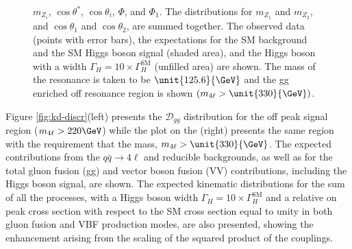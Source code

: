 \begin{figure}
{$m_{Z_i}$, $\cos\theta^*$, $\cos\theta_{i}$, $\Phi$, and $\Phi_{1}$. The distributions for $m_{Z_{1}}$ and $m_{Z_{2}}$, and $\cos\theta_{1}$ and $\cos\theta_{2}$, are summed together. The observed data (points with error bars), the expectations for the SM background and the SM Higgs boson signal (shaded area), and the Higgs boson with a width $\Gamma_{H} = 10 \times \Gamma_{H}^{\mathrm{SM}}$ (unfilled area) are shown. The mass of the resonance is taken to be $\unit{125.6}{\GeV}$ and the gg enriched off resonance region is shown $\left(m_{4\ell} > \unit{330}{\GeV}\right)$\cite{Khachatryan:2014iha}.}
\label{fig:Width_KD_inputs}
\end{figure}

Figure \ref{fig:kd-discr}(left) presents the $\mathcal{D}_{gg}$ distribution
for the off peak signal region ($m_{4\ell} > 220\GeV$) while the plot on the (right) presents the same region with the requirement that the mass, $m_{4\ell} > \unit{330}{\GeV}$.
The expected contributions from the $q\bar{q} \to 4\ell$ and reducible backgrounds,
as well as for the total gluon fusion (gg) and vector boson fusion (VV) contributions, including the
Higgs boson signal, are shown. The expected kinematic distributions for the sum of all the
processes, with a Higgs boson width $\Gamma_{H} = 10 \times \Gamma_{H}^{\mathrm{SM}}$ and a relative
on peak cross section with respect to the SM cross section equal to unity in both gluon fusion and VBF production
modes, are also presented, showing the enhancement arising from the scaling of the squared product of the couplings. 

